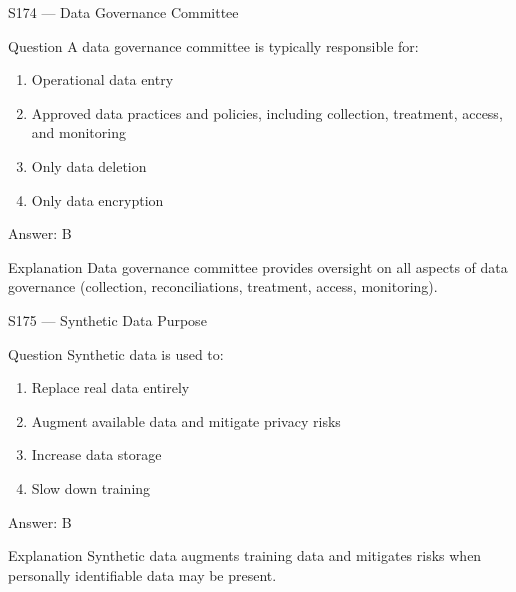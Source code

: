 \documentclass[aspectratio=169,8pt]{beamer}
\begin{document}
	\begin{frame}{S174 --- Data Governance Committee}
		\begin{block}{Question}
			A data governance committee is typically responsible for:
			\begin{enumerate}
				\item Operational data entry
				\item Approved data practices and policies, including collection, treatment, access, and monitoring
				\item Only data deletion
				\item Only data encryption
			\end{enumerate}
		\end{block}
		\begin{exampleblock}{Answer: B}\end{exampleblock}
		\begin{block}{Explanation}
			Data governance committee provides oversight on all aspects of data governance (collection, reconciliations, treatment, access, monitoring).
		\end{block}
	\end{frame}
	
	\begin{frame}{S175 --- Synthetic Data Purpose}
		\begin{block}{Question}
			Synthetic data is used to:
			\begin{enumerate}
				\item Replace real data entirely
				\item Augment available data and mitigate privacy risks
				\item Increase data storage
				\item Slow down training
			\end{enumerate}
		\end{block}
		\begin{exampleblock}{Answer: B}\end{exampleblock}
		\begin{block}{Explanation}
			Synthetic data augments training data and mitigates risks when personally identifiable data may be present.
		\end{block}
	\end{frame}
	
\end{document}
